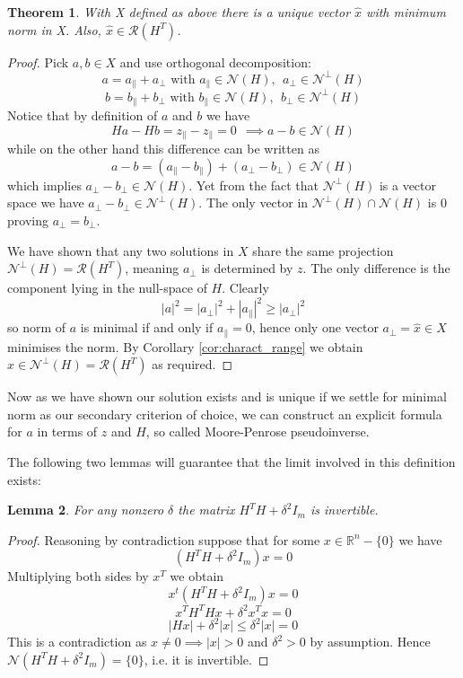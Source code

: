 \documentclass[a4paper]{article}
\theoremstyle{break}
\newtheorem{theorem}{Theorem}[section]
\newtheorem{lemma}[theorem]{Lemma}
\newcommand{\R}{\mathbb{R}}
\newcommand{\Nu}{\mathcal{N}}
\newcommand{\Ra}{\mathcal{R}}
\newcommand{\pll}{\parallel}
\begin{document}
\begin{theorem}\label{thm:regression_uniqueness}
    With X defined as above there is a unique vector $\hat{x}$ with minimum norm in X.
    Also, $\hat{x} \in \Ra(H^T)$.
\end{theorem}
\begin{proof}
    Pick $a, b \in X$ and use orthogonal decomposition:
    $$ a = a_\pll + a_\perp \text{ with } a_\pll \in \Nu(H),~~ a_\perp \in \Nu^\perp (H)$$
    $$ b = b_\pll + b_\perp \text{ with } b_\pll \in \Nu(H),~~ b_\perp \in \Nu^\perp (H)$$
    Notice that by definition of $a$ and $b$ we have
    $$ H a - H b = z_\pll - z_\pll = 0 ~~ \implies a - b \in \Nu(H)$$
    while on the other hand this difference can be written as
    $$ a - b = (a_\pll - b_\pll) + (a_\perp - b_\perp) \in \Nu(H)$$
    which implies $ a_\perp - b_\perp \in \Nu(H) $. Yet from the fact that $\Nu^\perp (H)$ is a vector space we have $ a_\perp - b_\perp \in \Nu^\perp (H)$. The only vector in $ \Nu^\perp (H) \cap \Nu (H)$ is $0$ proving $ a_\perp = b_\perp$.
    
    We have shown that any two solutions in $X$ share the same projection $\Nu^\perp (H) = \Ra(H^T)$, meaning $a_\perp$ is determined by $z$.
    The only difference is the component lying in the null-space of $H$. Clearly
    $$ | a |^2 = | a_\perp |^2 + |a_\pll |^2 \geq |a_\perp |^2$$
    so norm of $a$ is minimal if and only if $a_\pll = 0$, hence only one vector $a_\perp = \hat{x} \in X$ minimises the norm.
    By Corollary \ref{cor:charact_range} we obtain $ \hat{x} \in \Nu^\perp (H) = \Ra(H^T) $ as required.
\end{proof}
Now as we have shown our solution exists and is unique if we settle for minimal norm as our secondary criterion of choice, we can construct an explicit formula for $a$ in terms of $z$ and $H$, so called Moore-Penrose pseudoinverse.


The following two lemmas will guarantee that the limit involved in this definition exists:

\begin{lemma}\label{lem:invertible_1}
    For any nonzero $\delta$ the matrix $H^T H + \delta^2  I_m$ is invertible.
    \label{thm:invertible}
\end{lemma}
\begin{proof}
    Reasoning by contradiction suppose that for some $x \in \R^n - \{0\}$ we have
    $$ (H^T H + \delta^2  I_m) x = 0 $$ %
Multiplying both sides by $x^T$ we obtain
    $$ x^t (H^T H + \delta^2  I_m) x = 0 $$ %
    $$ x^T H^T H x + \delta^2 x^T x = 0 $$
    $$ | H x | + \delta^2 | x | \leq \delta^2 | x | = 0 $$
This is a contradiction as $ x \neq 0 \implies | x | > 0 $ and $ \delta^2 > 0$ by assumption.
Hence $\Nu(H^T H + \delta^2  I_m) = \{0\} $, i.e. it is invertible.
\end{proof}
\end{document}
